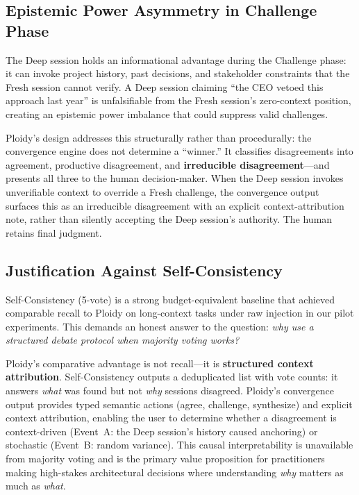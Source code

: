 \documentclass[11pt]{article}
\begin{document}
\subsection{Epistemic Power Asymmetry in Challenge Phase}
\label{sec:epistemic-power}

The Deep session holds an informational advantage during the Challenge phase: it can invoke project history, past decisions, and stakeholder constraints that the Fresh session cannot verify. A Deep session claiming ``the CEO vetoed this approach last year'' is unfalsifiable from the Fresh session's zero-context position, creating an epistemic power imbalance that could suppress valid challenges.

Ploidy's design addresses this structurally rather than procedurally: the convergence engine does not determine a ``winner.'' It classifies disagreements into agreement, productive disagreement, and \textbf{irreducible disagreement}---and presents all three to the human decision-maker. When the Deep session invokes unverifiable context to override a Fresh challenge, the convergence output surfaces this as an irreducible disagreement with an explicit context-attribution note, rather than silently accepting the Deep session's authority. The human retains final judgment.

\subsection{Justification Against Self-Consistency}
\label{sec:vs-self-consistency}

Self-Consistency (5-vote) is a strong budget-equivalent baseline that achieved comparable recall to Ploidy on long-context tasks under raw injection in our pilot experiments. This demands an honest answer to the question: \emph{why use a structured debate protocol when majority voting works?}

Ploidy's comparative advantage is not recall---it is \textbf{structured context attribution}. Self-Consistency outputs a deduplicated list with vote counts: it answers \emph{what} was found but not \emph{why} sessions disagreed. Ploidy's convergence output provides typed semantic actions (agree, challenge, synthesize) and explicit context attribution, enabling the user to determine whether a disagreement is context-driven (Event~A: the Deep session's history caused anchoring) or stochastic (Event~B: random variance). This causal interpretability is unavailable from majority voting and is the primary value proposition for practitioners making high-stakes architectural decisions where understanding \emph{why} matters as much as \emph{what}.
\end{document}

